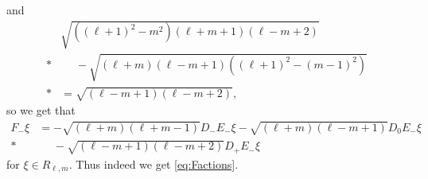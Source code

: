 and
\begin{align*}
  &\sqrt{((\ell+1)^2-m^2)(\ell+m+1)(\ell-m+2)} \\*
  &\phantom{{}={}}{} - \sqrt{(\ell+m)(\ell-m+1)((\ell+1)^2-(m-1)^2)} \\*
  &= \sqrt{(\ell-m+1)(\ell-m+2)},
\end{align*}
so we get that
\begin{align*}
  F_- \xi &= -\sqrt{(\ell+m)(\ell+m-1)} D_-E_- \xi - \sqrt{(\ell+m)(\ell-m+1)} D_0E_- \xi \\*
  &\phantom{{}={}}{} - \sqrt{(\ell-m+1)(\ell-m+2)} D_+E_- \xi
\end{align*}
for $\xi\in R_{\ell,m}$. Thus indeed we get \cref{eq:Factions}. 

